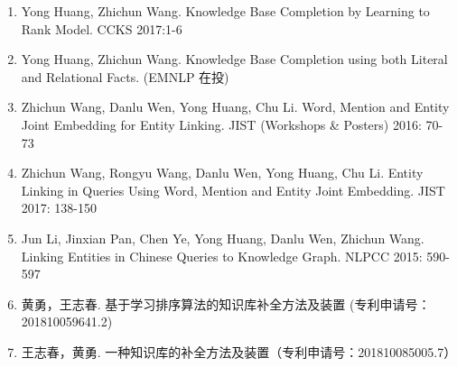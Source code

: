 \begin{paper}
\begin{enumerate}
  \item Yong Huang, Zhichun Wang. Knowledge Base Completion by Learning to Rank Model. CCKS 2017:1-6
  \item Yong Huang, Zhichun Wang. Knowledge Base Completion using both Literal and Relational Facts. (EMNLP 在投)
  \item Zhichun Wang, Danlu Wen, Yong Huang, Chu Li.
Word, Mention and Entity Joint Embedding for Entity Linking. JIST (Workshops & Posters) 2016: 70-73
 \item Zhichun Wang, Rongyu Wang, Danlu Wen, Yong Huang, Chu Li.
Entity Linking in Queries Using Word, Mention and Entity Joint Embedding. JIST 2017: 138-150
  \item Jun Li, Jinxian Pan, Chen Ye, Yong Huang, Danlu Wen, Zhichun Wang. 
  Linking Entities in Chinese Queries to Knowledge Graph. NLPCC 2015: 590-597
  \item 黄勇，王志春. 基于学习排序算法的知识库补全方法及装置 (专利申请号：201810059641.2)
  \item 王志春，黄勇. 一种知识库的补全方法及装置（专利申请号：201810085005.7）
  \end{enumerate}
\end{paper}
